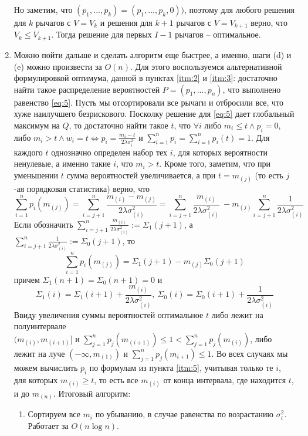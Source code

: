 \documentclass{article}
\begin{document}
\begin{enumerate}
    Но заметим, что $(p_1, ..., p_k) = (p_1, ..., p_{k}, 0))$, поэтому для любого решения для $k$ рычагов с $V = V_k$ и решения для $k+1$ рычагов с $V = V_{k+1}$ верно, что $V_k \leq V_{k+1}$. Тогда решение для первых $I - 1$ рычагов -- оптимальное.

    \item Можно пойти дальше и сделать алгоритм еще быстрее, а именно, шаги (d) и (e) можно произвести за $O(n)$. Для этого воспользуемся альтернативной формулировкой оптимума, данной в пунктах \ref{itm:2} и \ref{itm:3}: достаточно найти такое распределение вероятностей $P=(p_1,...,p_n)$, что выполнено равенство \ref{eq:5}. Пусть мы отсортировали все рычаги и отбросили все, что хуже наилучшего безрискового. Посколку решение для \ref{eq:5} дает глобальный максимум на $Q$, то достаточно найти такое $t$, что $\forall i$ либо $m_i \leq t \land p_i = 0$, либо $m_i > t \land w_i = t \Leftrightarrow p_i = \frac{m_i - t}{2\lambda \sigma_i^2}$ и $\sum_{i=1}^n p_i = \sum_{i=1}^n p_i(t) = 1$. Для каждого $t$ однозначно определен набор тех $i$, для которых вероятности ненулевые, а именно такие $i$, что $m_i > t$. Кроме того, заметим, что при уменьшении $t$ сумма вероятностей увеличивается, а при $t = m_{(j)}$ (то есть $j$-ая порядковая статистика) верно, что 
    $$\sum_{i=1}^n p_i(m_{(j)}) = \sum_{i=j+1}^n \frac{m_{(i)} - m_{(j)}}{2 \lambda \sigma_{(i)}^2} = \sum_{i=j+1}^n \frac{m_{(i)}}{2 \lambda \sigma_{(i)}^2} \: - m_{(j)} \sum_{i=j+1}^n \frac{1}{2 \lambda \sigma_{(i)}^2} $$
    Если обозначить $\sum_{i=j+1}^n \frac{m_{(i)}}{2 \lambda \sigma_{(i)}^2} := \Sigma_1(j+1)$, а $\sum_{i=j+1}^n \frac{1}{2 \lambda \sigma_{(i)}^2} := \Sigma_0(j+1)$, то 
    $$\label{eq:fast}
        \sum_{i=1}^n p_i(m_{(j)}) = \Sigma_1(j+1) - m_{(j)} \Sigma_0(j+1)
    $$
    причем $\Sigma_1(n+1) = \Sigma_0(n+1) = 0$ и $$\Sigma_1(i) = \Sigma_1(i+1) + \frac{m_{(i)}}{2\lambda \sigma_{(i)}^2}, \: \Sigma_0(i) = \Sigma_0(i+1) + \frac{1}{2\lambda \sigma_{(i)}^2}$$
    Ввиду увеличения суммы вероятностей оптимальное $t$ либо лежит на полуинтервале \\ $(m_{(i)}, m_{(i+1)}]$ и $\sum_{j=1}^n p_j (m_{(i+1)}) \leq 1 < \sum_{j=1}^n p_j (m_{(i)})$, либо лежит на луче $(-\infty, m_{(1)})$ и $\sum_{j=1}^n p_j (m_{i+1}) \leq 1$. Во всех случаях мы можем вычислить $p_i$ по формулам из пункта \ref{itm:5}, учитывая только те $i$, для которых $m_{(i)} \geq t$, то есть все $m_{(i)}$ от конца интервала, где находится $t$, и до $m_{(n)}$. Итоговый алгоритм:
    \begin{enumerate}
        \item Сортируем все $m_i$ по убыванию, в случае равенства по возрастанию $\sigma_i^2$. Работает за $O(n \log n)$.

\end{enumerate}
\end{enumerate}
\end{document}
